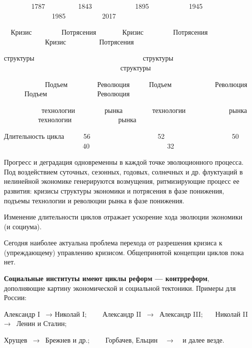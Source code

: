 \ \ \ \ \ \ \ \ 1787 \ \ \ \ \ \ \ \ \ 1843 \ \ \ \ \ \ \ \ \ \ \ \ 1895 \ \ \ \ \ \ \ \ \ \ \ 1945
\ \ \ \ \ \ \ \ \ \ \ \ \ \ 1985 \ \ \ \ \ \ \ \ \ \ 2017

\ \ Кризис \ \ \ \ \ \ \ \ Потрясения \ \ \ \ \ \ \ Кризис \ \ \ \ \ \ \ \ Потрясения \ \ \ \ \ \ \ \ \ \ \ \ Кризис
\ \ \ \ \ \ \ \ \ Потрясения \ \ \ \ \ \ \ \ \ \ \ \ \ \

структуры \ \ \ \ \ \ \ \ \ \ \ \ \ \ \ \ \ \ \ \ \ \ \ \ \ \ \ \ \ \ \ структуры
\ \ \ \ \ \ \ \ \ \ \ \ \ \ \ \ \ \ \ \ \ \ \ \ \ \ \ \ \ \ \ \ \ \ структуры


\bigskip

\ \ \ \ \ \ \ \ \ \ \ \ Подъем \ \ \ \ \ \ \ \ Революция \ \ \ \ \ Подъем \ \ \ \ \ \ \ \ \ \ \ \ Революция
\ \ \ \ \ \ Подъем \ \ \ \ \ \ \ \ \ \ \ \ \ \ Революция

\ \ \ \ \ \ \ \ \ \ \ технологии \ \ \ \ \ \ \ \ рынка \ \ \ \ \ \ \ \ технологии \ \ \ \ \ \ \ \ \ \ \ \ рынка
\ \ \ \ \ \ \ \ \ \ технологии \ \ \ \ \ \ \ \ \ \ \ \ \ рынка


\bigskip


Длительность цикла \ \ \ \ \ 56 \ \ \ \ \ \ \ \ \ \ \ \ \ \ \ \ \ \ \ 52 \ \ \ \ \ \ \ \ \ \ \ \ \ \ \ \ \ \ \ 50
\ \ \ \ \ \ \ \ \ \ \ \ \ \ \ \ \ \ \ \ \ \ \ 40 \ \ \ \ \ \ \ \ \ \ \ \ \ \ \ \ \ \ \ \ \ \ 32

\bigskip

Прогресс и деградация одновременны в каждой точке эволюционного процесса. Под воздействием суточных, сезонных, годовых,
солнечных и др. флуктуаций в нелинейной экономике генерируются возмущения, ритмизирующие процесс ее развития: кризисы
структуры экономики и потрясения в фазе понижения, подъемы технологии и революции рынка в фазе понижения.

Изменение длительности циклов отражает ускорение хода эволюции экономики (и социума).

Сегодня наиболее актуальна проблема перехода от разрешения кризиса к (упреждающему) управлению кризисом. Общепринятой
концепции циклов пока нет.

\textbf{Социальные институты имеют циклы реформ — контрреформ}, дополняющие картину экономической и социальной
тектоники. Примеры для России:

Александр I \ → Николай I; \ \ \ \ Александр II \ → \ Александр III; \ \ \ Николай II → \ Ленин и Сталин;

Хрущев \ → \ Брежнев и др.; \ \ \ \ Горбачев, Ельцин \ \ → \ \ и далее везде.


\bigskip


